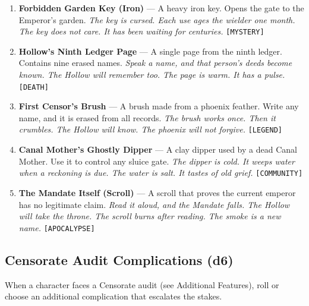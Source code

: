 \begin{enumerate}
\item \textbf{Forbidden Garden Key (Iron)} --- A heavy iron key. Opens the gate to the Emperor's garden.
  \hfill \textit{The key is cursed. Each use ages the wielder one month. The key does not care. It has been waiting for centuries.} \texttt{[MYSTERY]}
\item[\card{\diamondsuit}{J}] \textbf{Hollow's Ninth Ledger Page} --- A single page from the ninth ledger. Contains nine erased names.
  \hfill \textit{Speak a name, and that person's deeds become known. The Hollow will remember too. The page is warm. It has a pulse.} \texttt{[DEATH]}
\item[\card{\diamondsuit}{Q}] \textbf{First Censor's Brush} --- A brush made from a phoenix feather. Write any name, and it is erased from all records.
  \hfill \textit{The brush works once. Then it crumbles. The Hollow will know. The phoenix will not forgive.} \texttt{[LEGEND]}
\item[\card{\diamondsuit}{K}] \textbf{Canal Mother's Ghostly Dipper} --- A clay dipper used by a dead Canal Mother. Use it to control any sluice gate.
  \hfill \textit{The dipper is cold. It weeps water when a reckoning is due. The water is salt. It tastes of old grief.} \texttt{[COMMUNITY]}
\item[\card{\diamondsuit}{A}] \textbf{The Mandate Itself (Scroll)} --- A scroll that proves the current emperor has no legitimate claim.
  \hfill \textit{Read it aloud, and the Mandate falls. The Hollow will take the throne. The scroll burns after reading. The smoke is a new name.} \texttt{[APOCALYPSE]}
\end{enumerate}


\subsection*{Censorate Audit Complications (d6)}
\label{sec:sihai-audit-complications}

When a character faces a Censorate audit (see Additional Features), roll or choose an additional complication that escalates the stakes.


